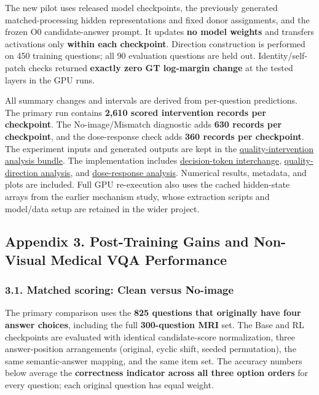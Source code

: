 \documentclass[
  10pt,
  a4paper,
]{article}
\begin{document}
The new pilot uses released model checkpoints, the previously generated
matched-processing hidden representations and fixed donor assignments,
and the frozen O0 candidate-answer prompt. It updates \textbf{no model
weights} and transfers activations only \textbf{within each checkpoint}.
Direction construction is performed on 450 training questions; all 90
evaluation questions are held out. Identity/self-patch checks returned
\textbf{exactly zero GT log-margin change} at the tested layers in the
GPU runs.

All summary changes and intervals are derived from per-question
predictions. The primary run contains \textbf{2,610 scored intervention
records per checkpoint}. The No-image/Mismatch diagnostic adds
\textbf{630 records per checkpoint}, and the dose-response check adds
\textbf{360 records per checkpoint}. The experiment inputs and generated
outputs are kept in the
\href{https://github.com/bbuller591-sketch/medical-vlm-visual-reliance/tree/main/experiments/quality_state_interchange_20261009}{quality-intervention
analysis bundle}. The implementation includes
\href{https://github.com/bbuller591-sketch/medical-vlm-visual-reliance/blob/main/experiments/quality_state_interchange_20261009/scripts/run_interchange.py}{decision-token
interchange},
\href{https://github.com/bbuller591-sketch/medical-vlm-visual-reliance/blob/main/experiments/quality_state_interchange_20261009/scripts/analyze.py}{quality-direction
analysis}, and
\href{https://github.com/bbuller591-sketch/medical-vlm-visual-reliance/blob/main/experiments/quality_state_interchange_20261009/scripts/dose_response.py}{dose-response
analysis}. Numerical results, metadata, and plots are included. Full GPU
re-execution also uses the cached hidden-state arrays from the earlier
mechanism study, whose extraction scripts and model/data setup are
retained in the wider project.

\subsection{Appendix 3. Post-Training Gains and Non-Visual Medical VQA
Performance}\label{appendix-3.-post-training-gains-and-non-visual-medical-vqa-performance}

\subsubsection{3.1. Matched scoring: Clean versus
No-image}\label{matched-scoring-clean-versus-no-image}

The primary comparison uses the \textbf{825 questions that originally
have four answer choices}, including the full \textbf{300-question MRI}
set. The Base and RL checkpoints are evaluated with identical
candidate-score normalization, three answer-position arrangements
(original, cyclic shift, seeded permutation), the same semantic-answer
mapping, and the same item set. The accuracy numbers below average the
\textbf{correctness indicator across all three option orders} for every
question; each original question has equal weight.
\end{document}
